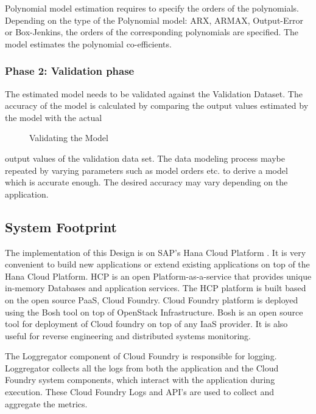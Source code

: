 \documentclass[article,type=msc,colorback,12pt,accentcolor=tud7b,table]{tudthesis}
\begin{document}
Polynomial model estimation requires to specify the orders of the polynomials. Depending on the type of the Polynomial model: ARX, ARMAX, Output-Error or Box-Jenkins,  the orders of the corresponding polynomials are specified. The model estimates the polynomial co-efficients.


  
\subsubsection{Phase 2: Validation phase}

The estimated model needs to be validated against the Validation Dataset. The accuracy of the model is calculated by comparing the output values estimated by the model with the actual
\begin{figure}[H]
  	\begin{center}
  		\makebox[\textwidth]{\texttt{[image: C8]}}
  	\end{center}
  	\caption{Validating the Model}
  \end{figure}
  output values of the validation data set. The data modeling process maybe repeated by varying parameters such as model orders etc. to derive a model which is accurate enough. The desired accuracy may vary depending on the application.

\subsection{System Footprint}
	The implementation of this Design is on SAP's Hana Cloud Platform \cite{hcp}. It is very convenient to build new applications or extend existing applications on top of the Hana Cloud Platform. HCP is an open Platform-as-a-service that provides unique in-memory Databases and application services. The HCP platform is built based on the open source PaaS, Cloud Foundry. Cloud Foundry platform is deployed using the Bosh tool on top of OpenStack Infrastructure. Bosh is an open source tool for deployment of Cloud foundry on top of any IaaS provider. It is also useful for reverse engineering and distributed systems monitoring.
	
	The Loggregator component of Cloud Foundry is responsible for logging. Loggregator collects all the logs from both the application and the Cloud Foundry system components, which interact with the application during execution. These Cloud Foundry Logs and API's are used to collect and aggregate the metrics. 
	
\end{document}
